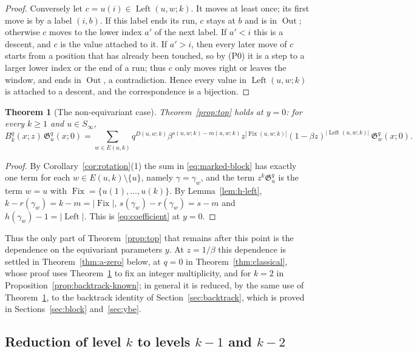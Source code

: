 \documentclass[11pt]{article}
\newtheorem{theorem}[proposition]{Theorem}
\newcommand{\G}{\mathfrak{G}}
\newcommand{\Fix}{\operatorname{Fix}}
\newcommand{\Left}{\operatorname{Left}}
\newcommand{\Out}{\operatorname{Out}}
\begin{document}
\begin{proof}
Conversely let $c=u(i)\in\Left(u,w;k)$. It moves at least once;
its first move is by a label $(i,b)$. If this label ends its run,
$c$ stays at $b$ and is in $\Out$; otherwise $c$ moves to the lower
index $a'$ of the next label. If $a'<i$ this is a descent, and $c$ is
the value attached to it. If $a'>i$, then every later move of $c$
starts from a position that has already been touched, so by (P0) it
is a step to a larger lower index or the end of a run; thus $c$ only
moves right or leaves the window, and ends in $\Out$, a
contradiction. Hence every value in $\Left(u,w;k)$ is attached to a
descent, and the correspondence is a bijection.
\end{proof}

\begin{theorem}[The non-equivariant case]\label{thm:noneq}
Theorem~\ref{prop:top} holds at $y=0$: for every $k\geq1$ and
$u\in S_\infty$,
\[
 B_k^q(x;z)\,\G_u^q(x;0)
 =\sum_{w\in E(u,k)}
   q^{D(u,w;k)}\beta^{s(u,w;k)-m(u,w;k)}
   z^{|\Fix(u,w;k)|}(1-\beta z)^{|\Left(u,w;k)|}\,
   \G_w^q(x;0).
\]
\end{theorem}

\begin{proof}
By Corollary~\ref{cor:rotation}(1) the sum in
\eqref{eq:marked-block} has exactly one term for each
$w\in E(u,k)\setminus\{u\}$, namely $\gamma=\gamma_w$, and the term
$z^k\G_u^q$ is the term $w=u$ with $\Fix=\{u(1),\ldots,u(k)\}$.
By Lemma~\ref{lem:h-left}, $k-r(\gamma_w)=k-m=|\Fix|$,
$s(\gamma_w)-r(\gamma_w)=s-m$ and $h(\gamma_w)-1=|\Left|$. This is
\eqref{eq:coefficient} at $y=0$.
\end{proof}

Thus the only part of Theorem~\ref{prop:top} that remains after this
point is the dependence on the equivariant parameters $y$. At
$z=1/\beta$ this dependence is settled in Theorem~\ref{thm:a-zero}
below, at $q=0$ in Theorem~\ref{thm:classical}, whose proof uses
Theorem~\ref{thm:noneq} to fix an integer multiplicity, and for $k=2$
in Proposition~\ref{prop:backtrack-known}; in general it is reduced,
by the same use of Theorem~\ref{thm:noneq}, to the backtrack identity
of Section~\ref{sec:backtrack}, which is proved in
Sections~\ref{sec:block} and~\ref{sec:ybe}.

\subsection{Reduction of level \texorpdfstring{$k$}{k} to levels \texorpdfstring{$k-1$}{k-1} and \texorpdfstring{$k-2$}{k-2}}
\label{sec:reduction}
\end{document}
